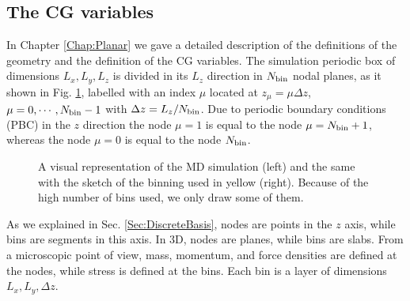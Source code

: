 \documentclass[b5paper,openright,10pt]{book}
\newcommand{\Note}[1]{{\bf \color{red}#1}}    %
\begin{document}
\subsection{The CG variables}
\label{Sec:CGVariablesPBC}
In Chapter \ref{Chap:Planar} we gave a detailed description of the definitions of the geometry and the definition of the CG variables.
The simulation periodic box of  dimensions $L_x,L_y,L_z$ is divided in
its $L_z$  direction in  $N_{\rm bin}$ nodal  planes, as it shown in Fig. \ref{fig:PBCBox}, labelled
with   an    index   $\mu$   located   at    $z_\mu=\mu   \Delta   z$,
$\mu=0,\cdots,N_{\rm bin}-1$ with $\Delta  z=L_z/N_{\rm bin}$.  Due to
periodic  boundary conditions  (PBC)  in the  $z$  direction the  node
$\mu=1$ is equal to the node  $\mu=N_{\rm bin}+1$, whereas the node $\mu=0$
is equal to the node  $N_{\rm bin}$.  

\begin{figure}
    \centering
    \caption[Visual representation of the MD simulation of an unconfined fluid]{A visual representation of the MD simulation (left) and the same with the sketch of the binning used in yellow (right). Because of the high number of bins used, we only draw some of them.}
    \label{fig:PBCBox}
\end{figure}

As we explained in Sec. \ref{Sec:DiscreteBasis}, nodes are  points  in  the $z$  axis,  while bins  are
segments in this axis.  In 3D, nodes are planes, while bins are slabs.
From  a microscopic point of  view, mass,
momentum, and force  densities are defined at the  nodes, while stress
is  defined  at  the  bins.   Each   bin  is  a  layer  of  dimensions
$L_x,L_y,\Delta z$. 
\end{document}
